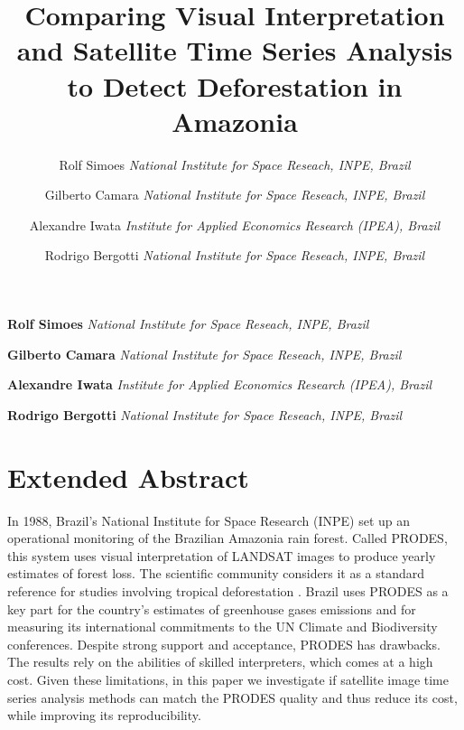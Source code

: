 \documentclass[11pt,]{article}
\title{Comparing Visual Interpretation and Satellite Time Series Analysis to
Detect Deforestation in Amazonia  }
\author{\Large Rolf Simoes\vspace{0.05in} \newline\normalsize\emph{National Institute for Space Reseach, INPE, Brazil}   \and \Large Gilberto Camara\vspace{0.05in} \newline\normalsize\emph{National Institute for Space Reseach, INPE, Brazil}   \and \Large Alexandre Iwata\vspace{0.05in} \newline\normalsize\emph{Institute for Applied Economics Research (IPEA), Brazil}   \and \Large Rodrigo Bergotti\vspace{0.05in} \newline\normalsize\emph{National Institute for Space Reseach, INPE, Brazil}  }
\date{}
\newcommand*{\authorfont}{\fontfamily{phv}\selectfont}
\begin{document}
%

{%
\setlength{\parindent}{0pt}
\thispagestyle{plain}
{\fontsize{18}{20}\selectfont\raggedright
\maketitle  %

}

{
   \vskip 13.5pt\relax \normalsize\fontsize{11}{12}
\textbf{\authorfont Rolf Simoes} \hskip 15pt \emph{\small National Institute for Space Reseach, INPE, Brazil}   \par \textbf{\authorfont Gilberto Camara} \hskip 15pt \emph{\small National Institute for Space Reseach, INPE, Brazil}   \par \textbf{\authorfont Alexandre Iwata} \hskip 15pt \emph{\small Institute for Applied Economics Research (IPEA), Brazil}   \par \textbf{\authorfont Rodrigo Bergotti} \hskip 15pt \emph{\small National Institute for Space Reseach, INPE, Brazil}   

}

}






\vskip 6.5pt

\setlength{\parskip}{6pt}
\noindent  \hypertarget{extended-abstract}{%
\section{Extended Abstract}\label{extended-abstract}}

In 1988, Brazil's National Institute for Space Research (INPE) set up an
operational monitoring of the Brazilian Amazonia rain forest. Called
PRODES, this system uses visual interpretation of LANDSAT images to
produce yearly estimates of forest loss. The scientific community
considers it as a standard reference for studies involving tropical
deforestation \citep{Morton2006}\citep{Hansen2013}. Brazil uses PRODES
as a key part for the country's estimates of greenhouse gases emissions
and for measuring its international commitments to the UN Climate and
Biodiversity conferences. Despite strong support and acceptance, PRODES
has drawbacks. The results rely on the abilities of skilled
interpreters, which comes at a high cost. Given these limitations, in
this paper we investigate if satellite image time series analysis
methods can match the PRODES quality and thus reduce its cost, while
improving its reproducibility.
\end{document}

